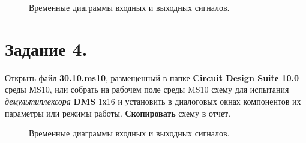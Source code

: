 \documentclass[spec, och, otchet, hidelinks]{SCWorks}
\begin{document}
\begin{figure}[h]
	\caption{Временные диаграммы входных и выходных сигналов.}
\end{figure}

\newpage

\section*{Задание 4.}

\par Открыть файл \textbf{30.10.ms10}, размещенный в папке \textbf{Circuit Design Suitе 10.0} 
среды МS10, или собрать на рабочем поле среды MS10 схему для испытания \textit{демультиплексора} 
\textbf{DMS} 1х16 и установить в диалоговых окнах компонентов их параметры или режимы работы.
\textbf{Скопировать} схему в отчет.

\begin{figure}[h]
	\caption{Временные диаграммы входных и выходных сигналов.}
\end{figure}
\end{document}
